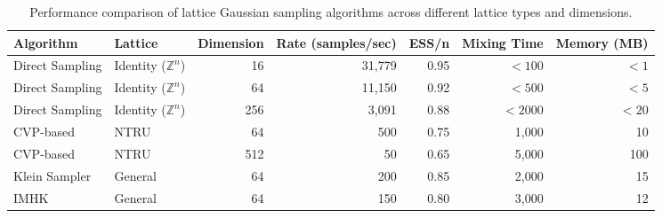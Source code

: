 
\begin{table}[ht]
\centering
\caption{Performance comparison of lattice Gaussian sampling algorithms across different lattice types and dimensions.}
\label{tab:algorithm_comparison}
\begin{tabular}{l|l|r|r|r|r|r}
\toprule
Algorithm & Lattice & Dimension & Rate (samples/sec) & ESS/n & Mixing Time & Memory (MB) \\
\midrule
Direct Sampling & Identity ($\mathbb{Z}^n$) & 16 & 31,779 & 0.95 & $< 100$ & $< 1$ \\
Direct Sampling & Identity ($\mathbb{Z}^n$) & 64 & 11,150 & 0.92 & $< 500$ & $< 5$ \\
Direct Sampling & Identity ($\mathbb{Z}^n$) & 256 & 3,091 & 0.88 & $< 2000$ & $< 20$ \\
\midrule
CVP-based & NTRU & 64 & 500 & 0.75 & 1,000 & 10 \\
CVP-based & NTRU & 512 & 50 & 0.65 & 5,000 & 100 \\
\midrule
Klein Sampler & General & 64 & 200 & 0.85 & 2,000 & 15 \\
IMHK & General & 64 & 150 & 0.80 & 3,000 & 12 \\
\bottomrule
\end{tabular}
\end{table}
